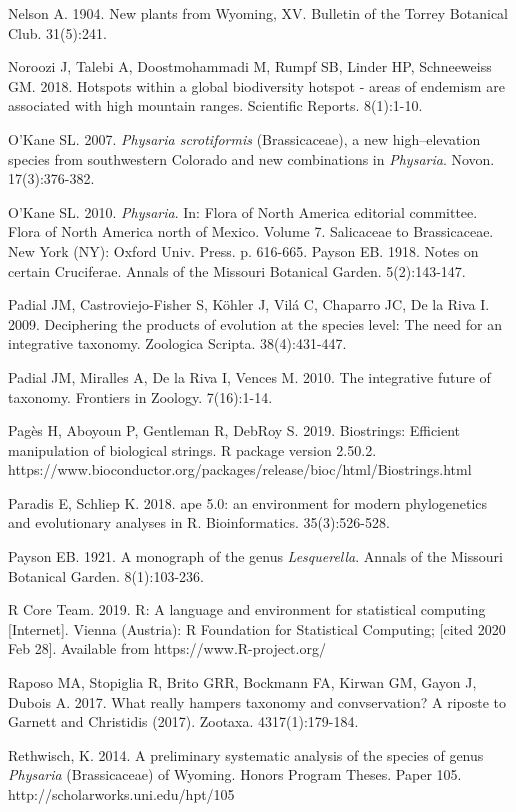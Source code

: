 Nelson A. 1904. New plants from Wyoming, XV. Bulletin of the Torrey Botanical Club. 31(5):241.

Noroozi J, Talebi A, Doostmohammadi M, Rumpf SB, Linder HP, Schneeweiss GM. 2018. Hotspots within a global biodiversity hotspot - areas of endemism are associated with high mountain ranges. Scientific Reports. 8(1):1-10.

O’Kane SL. 2007. \textit{Physaria scrotiformis} (Brassicaceae), a new high–elevation species from southwestern Colorado and new combinations in \textit{Physaria}. Novon. 17(3):376-382.

O’Kane SL. 2010. \textit{Physaria}. In: Flora of North America editorial committee. Flora of North America north of Mexico. Volume 7. Salicaceae to Brassicaceae. New York (NY): Oxford Univ. Press. p. 616-665.
Payson EB. 1918. Notes on certain Cruciferae. Annals of the Missouri Botanical Garden. 5(2):143-147.

Padial JM, Castroviejo-Fisher S, Köhler J, Vilá C, Chaparro JC, De la Riva I. 2009. Deciphering the products of evolution at the species level: The need for an integrative taxonomy. Zoologica Scripta. 38(4):431-447.

Padial JM, Miralles A, De la Riva I, Vences M. 2010. The integrative future of taxonomy. Frontiers in Zoology. 7(16):1-14.

Pagès H, Aboyoun P, Gentleman R, DebRoy S. 2019. Biostrings: Efficient manipulation of biological strings. R package version 2.50.2. https://www.bioconductor.org/packages/release/bioc/html/Biostrings.html

Paradis E, Schliep K. 2018. ape 5.0: an environment for modern phylogenetics
and evolutionary analyses in R. Bioinformatics. 35(3):526-528.

Payson EB. 1921. A monograph of the genus \textit{Lesquerella}. Annals of the Missouri Botanical Garden. 8(1):103-236.

R Core Team. 2019. R: A language and environment for statistical computing [Internet]. Vienna (Austria): R Foundation for Statistical Computing; [cited 2020 Feb 28]. Available from https://www.R-project.org/

Raposo MA, Stopiglia R, Brito GRR, Bockmann FA, Kirwan GM, Gayon J, Dubois A. 2017. What really hampers taxonomy and convservation? A riposte to Garnett and Christidis (2017). Zootaxa. 4317(1):179-184.

Rethwisch, K. 2014. A preliminary systematic analysis of the species of genus \textit{Physaria} (Brassicaceae) of Wyoming. Honors Program Theses. Paper 105.
http://scholarworks.uni.edu/hpt/105

